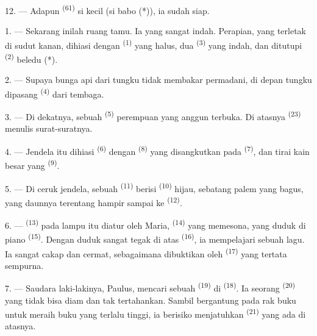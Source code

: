 12. --- Adapun  \textsuperscript{(61)} si kecil
(si babo (*)), ia sudah siap.

\VUsaut{5.0mm}
\VUsaut{3.0mm}

1. --- Sekarang inilah ruang tamu. Ia  yang sangat
indah. Perapian, yang terletak di sudut kanan, dihiasi dengan
 \textsuperscript{(1)} yang halus, dua
 \textsuperscript{(3)} yang indah, dan ditutupi
 \textsuperscript{(2)} beledu (*).

2. --- Supaya bunga api dari tungku tidak membakar permadani, di
depan tungku dipasang  \textsuperscript{(4)}
dari tembaga.

3. --- Di dekatnya, sebuah  \textsuperscript{(5)}
perempuan yang anggun terbuka. Di atasnya 
\textsuperscript{(23)} menulis surat-suratnya.

4. --- Jendela itu dihiasi  \textsuperscript{(6)}
dengan  \textsuperscript{(8)} yang disangkutkan
pada  \textsuperscript{(7)}, dan tirai kain besar yang
 \textsuperscript{(9)}.

5. --- Di ceruk jendela, sebuah 
\textsuperscript{(11)} berisi  \textsuperscript{(10)}
hijau, sebatang palem yang bagus, yang daunnya terentang hampir sampai
ke  \textsuperscript{(12)}.

6. ---  \textsuperscript{(13)} pada lampu itu diatur
oleh Maria,  \textsuperscript{(14)} yang memesona, yang
duduk di piano \textsuperscript{(15)}. Dengan duduk sangat tegak di
atas  \textsuperscript{(16)}, ia mempelajari
sebuah lagu. Ia sangat cakap dan cermat, sebagaimana dibuktikan oleh
 \textsuperscript{(17)} yang tertata sempurna.

\VUsaut{5.0mm}
\VUsaut{3.0mm}

7. --- Saudara laki-lakinya, Paulus, mencari sebuah 
\textsuperscript{(19)} di  \textsuperscript{(18)}. Ia
seorang  \textsuperscript{(20)} yang tidak bisa diam
dan tak tertahankan. Sambil bergantung pada rak buku untuk meraih buku
yang terlalu tinggi, ia berisiko menjatuhkan 
\textsuperscript{(21)} yang ada di atasnya.

